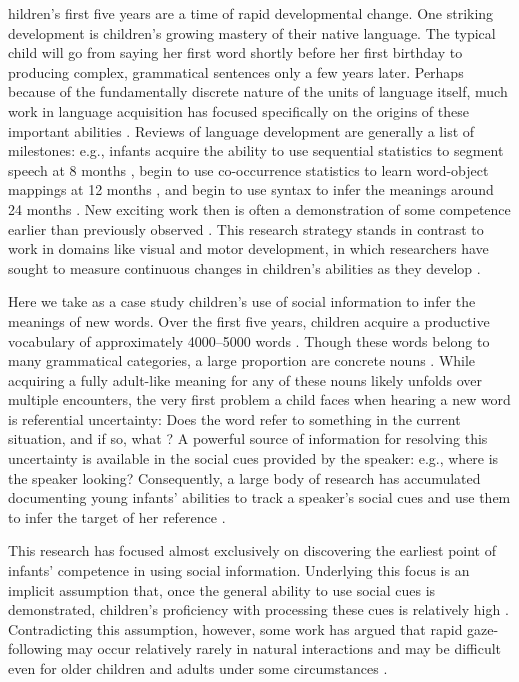 \documentclass{pnastwo}
\begin{document}
\begin{article}
hildren's first five years are a time of rapid developmental change. One striking development is children's growing mastery of their native language. The typical child will go from saying her first word shortly before her first birthday to producing complex, grammatical sentences only a few years later. Perhaps because of the fundamentally discrete nature of the units of language itself, much work in language acquisition has focused specifically on the origins of these important abilities \cite[but c.f.][]{fernald1998, port2005}. Reviews of language development are generally a list of milestones: e.g., infants acquire the ability to use sequential statistics to segment speech at 8 months \cite{saffran1996}, begin to use co-occurrence statistics to learn word-object mappings at 12 months \cite{smith2008}, and begin to use syntax to infer the meanings around 24 months \cite{gertner2006}. New exciting work then is often a demonstration of some competence earlier than previously observed \cite{bergelson2012}. This research strategy stands in contrast to work in domains like visual and motor development, in which researchers have sought to measure continuous changes in children's abilities as they develop \cite{sokol1978, banks1980, forssberg1991, thelen1995}.

Here we take as a case study children's use of social information to infer the meanings of new words. Over the first five years, children acquire a productive vocabulary of approximately 4000--5000 words \cite{goulden1990}. Though these words belong to many grammatical categories, a large proportion are concrete nouns \cite{bates1994}. While acquiring a fully adult-like meaning for any of these nouns likely unfolds over multiple encounters, the very first problem a child faces when hearing a new word is referential uncertainty: Does the word refer to something in the current situation, and if so, what \cite{carey1978, yu2007, frank2009}? A powerful source of information for resolving this uncertainty is available in the social cues provided by the speaker: e.g., where is the speaker looking? Consequently, a large body of research has accumulated documenting young infants' abilities to track a speaker's social cues and use them to infer the target of her reference \cite[e.g.][]{scaife1975, baldwin1993, hollich2000, senju2008}.

This research has focused almost exclusively on discovering the earliest point of infants' competence in using social information. Underlying this focus is an implicit assumption that, once the general ability to use social cues is demonstrated, children's proficiency with processing these cues is relatively high \cite[e.g.][]{corkum1998, brooks2005, csibra2009}. Contradicting this assumption, however, some work has argued that rapid gaze-following may occur relatively rarely in natural interactions and may be difficult even for older children and adults under some circumstances \cite{loomis2008, vida2012, yu2013}. 


\end{article}
\end{document}
